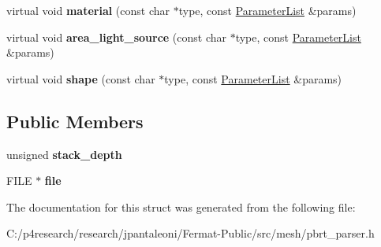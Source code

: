 \begin{DoxyCompactItemize}
\item 
\mbox{\label{structpbrt_1_1_echo_importer_a92ad1e14f9102d64f79ede386ec77cc4}} 
virtual void {\bfseries material} (const char $\ast$type, const \hyperlink{structpbrt_1_1_parameter_list}{Parameter\+List} \&params)
\item 
\mbox{\label{structpbrt_1_1_echo_importer_ad0a69e12f4c24350bdaf22b9d95e8fb9}} 
virtual void {\bfseries area\+\_\+light\+\_\+source} (const char $\ast$type, const \hyperlink{structpbrt_1_1_parameter_list}{Parameter\+List} \&params)
\item 
\mbox{\label{structpbrt_1_1_echo_importer_a4e60b5b504e8f6dea8c0e81ea1ce4871}} 
virtual void {\bfseries shape} (const char $\ast$type, const \hyperlink{structpbrt_1_1_parameter_list}{Parameter\+List} \&params)
\end{DoxyCompactItemize}
\subsection*{Public Members}
\begin{DoxyCompactItemize}
\item 
\mbox{\label{structpbrt_1_1_echo_importer_acf7ef114be0c4bcfcddb039919eafb40}} 
unsigned {\bfseries stack\+\_\+depth}
\item 
\mbox{\label{structpbrt_1_1_echo_importer_adf490dd1aebabeb852a41f9f62e7be68}} 
F\+I\+LE $\ast$ {\bfseries file}
\end{DoxyCompactItemize}


The documentation for this struct was generated from the following file\+:\begin{DoxyCompactItemize}
\item 
C\+:/p4research/research/jpantaleoni/\+Fermat-\/\+Public/src/mesh/pbrt\+\_\+parser.\+h\end{DoxyCompactItemize}
